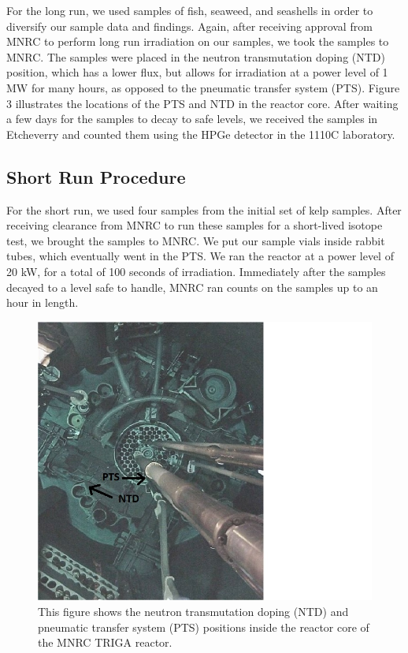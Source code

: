 \documentclass[]{article}
\begin{document}
For the long run, we used samples of fish, seaweed, and seashells in order to diversify our sample data and findings.  Again, after receiving approval from MNRC to perform long run irradiation on our samples, we took the samples to MNRC.  The samples were placed in the neutron transmutation doping (NTD) position, which has a lower flux, but allows for irradiation at a power level of 1 MW for many hours, as opposed to the pneumatic transfer system (PTS). Figure 3 illustrates the locations of the PTS and NTD in the reactor core.  After waiting a few days for the samples to decay to safe levels, we received the samples in Etcheverry and counted them using the HPGe detector in the 1110C laboratory.

\subsection{Short Run Procedure}
For the short run, we used four samples from the initial set of kelp samples.  After receiving clearance from MNRC to run these samples for a short-lived isotope test, we brought the samples to MNRC.  We put our sample vials inside rabbit tubes, which eventually went in the PTS. We ran the reactor at a power level of 20 kW, for a total of 100 seconds of irradiation. Immediately after the samples decayed to a level safe to handle, MNRC ran counts on the samples up to an hour in length.  

\begin{figure}[htb!]
\centering
\includegraphics[scale=0.5]{Reactor}
\caption{This figure shows the neutron transmutation doping (NTD) and pneumatic transfer system (PTS) positions inside the reactor core of the MNRC TRIGA reactor.}
\end{figure} 
\pagebreak
\end{document}
